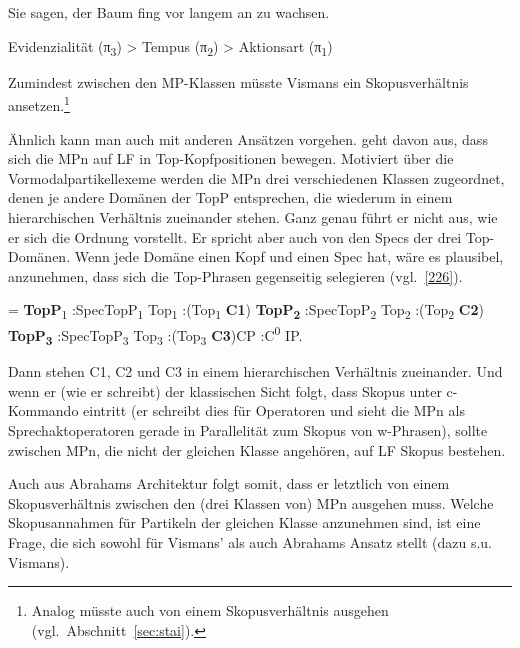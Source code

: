 \begin{exe}
	\ex\label{224} 
	Sie sagen, der Baum fing vor langem an zu wachsen.
\end{exe}
\begin{exe}
	\ex\label{225} 
	Evidenzialität (π\textsubscript{3}) > Tempus (π\textsubscript{2}) > Aktionsart (π\textsubscript{1})
\end{exe}
Zumindest zwischen den MP-Klassen müsste Vismans ein Skopusverhältnis  ansetzen.\footnote{Analog müsste auch \citet{Ickler1994} von einem Skopusverhältnis ausgehen (vgl.\ Abschnitt~\ref{sec:stai}).}

Ähnlich kann man auch mit anderen Ansätzen vorgehen. \citet{Abraham1995} geht davon aus, dass sich die MPn auf LF in Top-Kopfpositionen bewegen. Motiviert über die Vormodalpartikellexeme  werden die MPn drei verschiedenen Klassen zugeordnet, denen je andere Domänen der TopP entsprechen, die wiederum in einem hierarchischen Verhältnis zueinander stehen. Ganz genau führt er nicht aus, wie er sich die Ordnung vorstellt. Er spricht aber auch von den Specs der drei Top-Domänen. Wenn jede Domäne einen Kopf und einen Spec hat, wäre es plausibel, anzunehmen, dass sich die Top-Phrasen gegenseitig selegieren (vgl.\ \ref{226}).

\begin{exe}
	\ex\label{226}   
\begin{jtree}
\! = {{\textbf{TopP}}\textsubscript{1}}
:{SpecTopP\textsubscript{1}} {Top{\textsubscript{1}}}
:({Top{\textsubscript{1}}} {\textbf{C1}}) {\textbf{TopP}\textsubscript{\textbf{2}}}
:{SpecTopP\textsubscript{2}} {Top{\textsubscript{2}}}
:({Top{\textsubscript{2}}} {\textbf{\textbf{C2}}}) {{\textbf{TopP}}\textsubscript{\textbf{3}}}
:{SpecTopP\textsubscript{3}} {Top{\textsubscript{3}}}
:({Top{\textsubscript{3}}} {\textbf{C3}}){CP}
:{C\textsuperscript{0}} {IP}.
\end{jtree}
\end{exe}
Dann stehen C1, C2 und C3 in einem hierarchischen Verhältnis zueinander. Und wenn er (wie er schreibt) der klassischen Sicht folgt, dass Skopus  unter c-Kom\-man\-do  eintritt (er schreibt dies für Operatoren und sieht die MPn als Sprechaktoperatoren gerade in Parallelität zum Skopus von w-Phrasen), sollte zwischen MPn, die nicht der gleichen Klasse angehören, auf LF Skopus bestehen.

Auch aus Abrahams Architektur folgt somit, dass er letztlich von einem Skopusverhältnis zwischen den (drei Klassen von) MPn ausgehen muss. Welche Skopusannahmen für Partikeln der gleichen Klasse anzunehmen sind, ist eine Frage, die sich sowohl für Vismans' als auch Abrahams Ansatz stellt (dazu s.u. Vismans).\\

